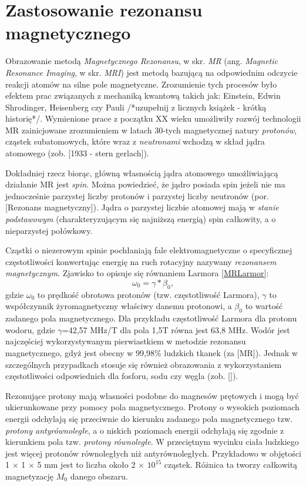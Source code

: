 \section{Zastosowanie rezonansu magnetycznego}
Obrazowanie metodą \textit{Magnetycznego Rezonansu}, w skr. \textit{MR} (ang. \textit{Magnetic Resonance Imaging}, w skr. \textit{MRI}) jest metodą bazującą na odpowiednim odczycie reakcji atomów na silne pole magnetyczne. Zrozumienie tych procesów było efektem prac związanych z mechaniką kwantową takich jak: Einstein, Edwin Shrodinger, Heisenberg czy Pauli /*uzupełnij z licznych książek - krótką historię*/. Wymienione prace z początku XX wieku umożliwiły rozwój technologii MR zainicjowane zrozumieniem w latach 30-tych magnetycznej natury \textit{protonów}, cząstek subatomowych, które wraz z \textit{neutronami} wchodzą w skład jądra atomowego (zob. [1933 - stern gerlach]).

Dokładniej rzecz biorąc, główną własnością jądra atomowego umożliwiającą działanie MR jest \textit{spin}. Można powiedzieć, że jądro posiada spin jeżeli nie ma jednocześnie parzystej liczby protonów i parzystej liczby neutronów (por. [Rezonans magnetyczny]). Jądra o parzystej liczbie atomowej mają w \textit{stanie podstawowym} (charakteryzującym się najniższą energią) spin całkowity, a o nieparzystej połówkowy.

Cząstki o niezerowym spinie pochłaniają fale elektromagnetyczne o specyficznej częstotliwości konwertując energię na ruch rotacyjny nazywany \textit{rezonansem magnetycznym}. Zjawisko to opisuje się równaniem Larmora \ref{MRLarmor}:
\begin{equation}
\label{MRLarmor}
\omega_0 = \gamma \ast \beta_0,
\end{equation}
gdzie $\omega_0$ to prędkość obrotowa protonów (tzw. częstotliwość Larmora), $\gamma$ to współczynnik żyromagnetyczny właściwy danemu protonowi, a $\beta_0$ to wartość zadanego pola magnetycznego. Dla przykładu częstotliwość Larmora dla protonu wodoru, gdzie $\gamma$=42,57 MHz/T dla pola 1,5T równa jest 63,8 MHz. Wodór jest najczęściej wykorzystywanym pierwiastkiem w metodzie rezonansu magnetycznego, gdyż jest obecny w 99,98\% ludzkich tkanek (za [MR]). Jednak w szczególnych przypadkach stosuje się również obrazowania z wykorzystaniem częstotliwości odpowiednich dla fosforu, sodu czy węgla (zob. []).

Rezonujące protony mają własności podobne do magnesów prętowych i mogą być ukierunkowane przy pomocy pola magnetycznego. Protony o wysokich poziomach energii odchylają się przeciwnie do kierunku zadanego pola magnetycznego tzw. \textit{protony antyrównoległe}, a o niskich poziomach energii odchylają się zgodnie z kierunkiem pola tzw. \textit{protony równoległe}. W przeciętnym wycinku ciała ludzkiego jest więcej protonów równoległych niż antyrównoległych. Przykładowo w objętości 1 $\times$ 1 $\times$ 5 mm jest to liczba około 2 $\times$ $10^15$ cząstek. Różnica ta tworzy całkowitą magnetyzację $M_0$ danego obszaru.

